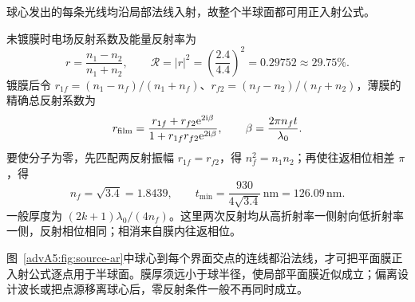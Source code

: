 \begin{advsolution}
球心发出的每条光线均沿局部法线入射，故整个半球面都可用正入射公式。
\begin{center}\begin{minipage}{\linewidth}\centering
\end{minipage}\end{center}
未镀膜时电场反射系数及能量反射率为
\[
 r=\frac{n_1-n_2}{n_1+n_2},\qquad
 \boxed{\mathcal R=|r|^2=\left(\frac{2.4}{4.4}\right)^2=0.29752\approx29.75\%}.
\]
镀膜后令 $r_{1f}=(n_1-n_f)/(n_1+n_f)$、$r_{f2}=(n_f-n_2)/(n_f+n_2)$，薄膜的精确总反射系数为
\[
 r_{\rm film}=\frac{r_{1f}+r_{f2}\mathrm e^{2\mathrm i\beta}}{1+r_{1f}r_{f2}\mathrm e^{2\mathrm i\beta}},\qquad
 \beta=\frac{2\pi n_ft}{\lambda_0}.
\]
要使分子为零，先匹配两反射振幅 $r_{1f}=r_{f2}$，得 $n_f^2=n_1n_2$；再使往返相位相差 $\pi$，得
\[
 \boxed{n_f=\sqrt{3.4}=1.8439},\qquad
 \boxed{t_{\min}=\frac{930}{4\sqrt{3.4}}\,\mathrm{nm}=126.09\,\mathrm{nm}}.
\]
一般厚度为 $(2k+1)\lambda_0/(4n_f)$。这里两次反射均从高折射率一侧射向低折射率一侧，反射相位相同；相消来自膜内往返相位。

图~\ref{advA5:fig:source-ar}中球心到每个界面交点的连线都沿法线，才可把平面膜正入射公式逐点用于半球面。膜厚须远小于球半径，使局部平面膜近似成立；偏离设计波长或把点源移离球心后，零反射条件一般不再同时成立。
\end{advsolution}

